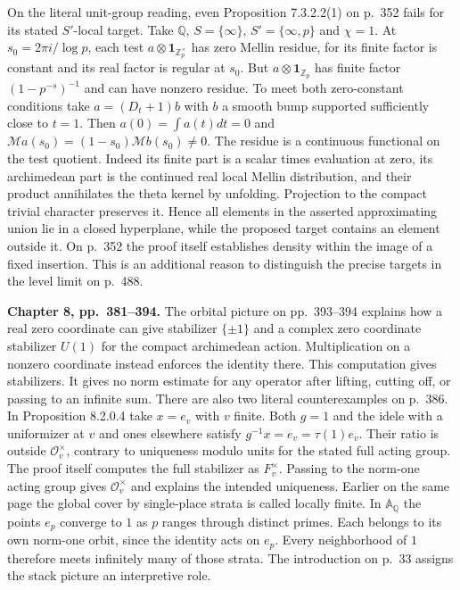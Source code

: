 \documentclass[11pt,letterpaper]{article}
\newcommand{\Q}{\mathbb Q}
\newcommand{\Z}{\mathbb Z}
\newcommand{\A}{\mathbb A}
\newcommand{\OO}{\mathcal O}
\newcommand{\M}{\mathcal M}
\newcommand{\one}{\mathbf 1}
\newcommand{\head}[1]{\par\smallskip\textbf{#1}\enspace}
\begin{document}
On the literal unit-group reading, even Proposition 7.3.2.2(1) on p.~352 fails for its stated $S'$-local target. Take $\Q$, $S=\{\infty\}$, $S'=\{\infty,p\}$ and $\chi=1$. At $s_0=2\pi i/\log p$, each test $a\otimes\one_{\Z_p^\times}$ has zero Mellin residue, for its finite factor is constant and its real factor is regular at $s_0$. But $a\otimes\one_{\Z_p}$ has finite factor $(1-p^{-s})^{-1}$ and can have nonzero residue. To meet both zero-constant conditions take $a=(D_t+1)b$ with $b$ a smooth bump supported sufficiently close to $t=1$. Then $a(0)=\int a(t)dt=0$ and $\M a(s_0)=(1-s_0)\M b(s_0)\ne0$. The residue is a continuous functional on the test quotient. Indeed its finite part is a scalar times evaluation at zero, its archimedean part is the continued real local Mellin distribution, and their product annihilates the theta kernel by unfolding. Projection to the compact trivial character preserves it. Hence all elements in the asserted approximating union lie in a closed hyperplane, while the proposed target contains an element outside it. On p.~352 the proof itself establishes density within the image of a fixed insertion. This is an additional reason to distinguish the precise targets in the level limit on p.~488.

\head{Chapter 8, pp.~381--394.} The orbital picture on pp.~393--394 explains how a real zero coordinate can give stabilizer $\{\pm1\}$ and a complex zero coordinate stabilizer $U(1)$ for the compact archimedean action. Multiplication on a nonzero coordinate instead enforces the identity there. This computation gives stabilizers. It gives no norm estimate for any operator after lifting, cutting off, or passing to an infinite sum. There are also two literal counterexamples on p.~386. In Proposition 8.2.0.4 take $x=e_v$ with $v$ finite. Both $g=1$ and the idele with a uniformizer at $v$ and ones elsewhere satisfy $g^{-1}x=e_v=\tau(1)e_v$. Their ratio is outside $\OO_v^\times$, contrary to uniqueness modulo units for the stated full acting group. The proof itself computes the full stabilizer as $F_v^\times$. Passing to the norm-one acting group gives $\OO_v^\times$ and explains the intended uniqueness. Earlier on the same page the global cover by single-place strata is called locally finite. In $\A_\Q$ the points $e_p$ converge to $1$ as $p$ ranges through distinct primes. Each belongs to its own norm-one orbit, since the identity acts on $e_p$. Every neighborhood of $1$ therefore meets infinitely many of those strata. The introduction on p.~33 assigns the stack picture an interpretive role.
\end{document}
